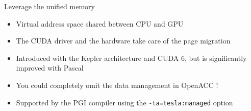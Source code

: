 \documentclass[12pt,aspectratio=169]{beamer}
\newcommand\shinline[2][]{\lstinline[style=shstyle,basicstyle=\ttfamily,#1]!#2!}
\begin{document}
\begin{frame}[fragile]{Leverage the unified memory}
  \begin{itemize}
  \item Virtual address space shared between CPU and GPU
  \item The CUDA driver and the hardware take care of the page migration
  \item Introduced with the Kepler architecture and CUDA 6, but is significantly improved with Pascal
    \pause\vfill
  \item You could completely omit the data management in OpenACC !
  \item Supported by the PGI compiler using the \shinline{-ta=tesla:managed} option
  \end{itemize}
\end{frame}



\end{document}
